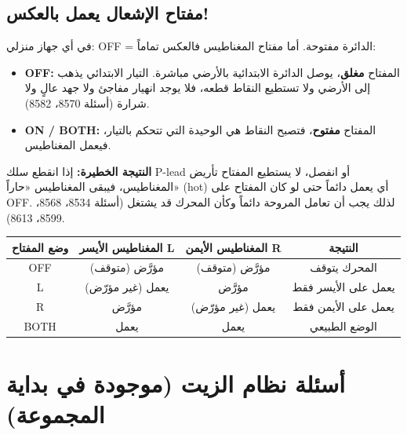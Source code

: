\documentclass[11pt,a4paper]{article}
\newcommand{\en}[1]{\textenglish{#1}}
\begin{document}
\subsection{مفتاح الإشعال يعمل بالعكس!}
في أي جهاز منزلي: \en{OFF} = الدائرة مفتوحة. أما مفتاح المغناطيس فالعكس تماماً:
\begin{itemize}
  \item \textbf{\en{OFF}:} المفتاح \textbf{مغلق}، يوصل الدائرة الابتدائية بالأرضي مباشرة. التيار الابتدائي يذهب إلى الأرضي ولا تستطيع النقاط قطعه، فلا يوجد انهيار مفاجئ ولا جهد عالٍ ولا شرارة (أسئلة 8570، 8582).
  \item \textbf{\en{ON / BOTH}:} المفتاح \textbf{مفتوح}، فتصبح النقاط هي الوحيدة التي تتحكم بالتيار، فيعمل المغناطيس.
\end{itemize}
\textbf{النتيجة الخطيرة:} إذا انقطع سلك \en{P-lead} أو انفصل، لا يستطيع المفتاح تأريض المغناطيس، فيبقى المغناطيس «حاراً» (\en{hot}) أي يعمل دائماً حتى لو كان المفتاح على \en{OFF}. لذلك يجب أن تعامل المروحة دائماً وكأن المحرك قد يشتغل (أسئلة 8534، 8568، 8599، 8613).

\begin{center}
\begin{tabular}{|c|c|c|c|}
\hline
\textbf{وضع المفتاح} & \textbf{المغناطيس الأيسر \en{L}} & \textbf{المغناطيس الأيمن \en{R}} & \textbf{النتيجة}\\\hline
\en{OFF} & مؤرَّض (متوقف) & مؤرَّض (متوقف) & المحرك يتوقف\\\hline
\en{L} & يعمل (غير مؤرّض) & مؤرَّض & يعمل على الأيسر فقط\\\hline
\en{R} & مؤرَّض & يعمل (غير مؤرّض) & يعمل على الأيمن فقط\\\hline
\en{BOTH} & يعمل & يعمل & الوضع الطبيعي\\\hline
\end{tabular}
\end{center}

\newpage
\section{أسئلة نظام الزيت (موجودة في بداية المجموعة)}
\end{document}
